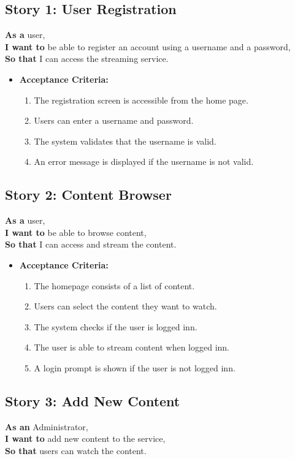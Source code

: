 \documentclass[12pt]{article}
\begin{document}
\subsection{Story 1: User Registration}
\textbf{As a} user, \\
\textbf{I want to} be able to register an account using a username and a password, \\
\textbf{So that} I can access the streaming service.

\begin{itemize}[label={}]
    \item \textbf{Acceptance Criteria:}
    \begin{enumerate}
        \item The registration screen is accessible from the home page.
        \item Users can enter a username and password.
        \item The system validates that the username is valid.
        \item An error message is displayed if the username is not valid.
    \end{enumerate}
\end{itemize}

\subsection{Story 2: Content Browser}
\textbf{As a} user, \\
\textbf{I want to} be able to browse content, \\
\textbf{So that} I can access and stream the content.

\begin{itemize}[label={}]
    \item \textbf{Acceptance Criteria:}
    \begin{enumerate}
        \item The homepage consists of a list of content.
        \item Users can select the content they want to watch.
        \item The system checks if the user is logged inn.
        \item The user is able to stream content when logged inn.
        \item A login prompt is shown if the user is not logged inn.
    \end{enumerate}
\end{itemize}

\subsection{Story 3: Add New Content}
\textbf{As an} Administrator, \\
\textbf{I want to} add new content to the service, \\
\textbf{So that} users can watch the content.
\end{document}
